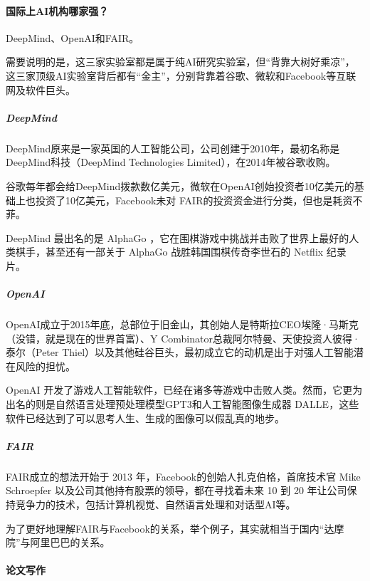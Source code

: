 \documentclass[letterpaper,10pt,english]{sphinxmanual}
\begin{document}
\paragraph{国际上AI机构哪家强？}
\label{\detokenize{chapter_AI_dive/AI_Research:id1}}
DeepMind、OpenAI和FAIR。

需要说明的是，这三家实验室都是属于纯AI研究实验室，但“背靠大树好乘凉”，这三家顶级AI实验室背后都有“金主”，分别背靠着谷歌、微软和Facebook等互联网及软件巨头。


\subparagraph{DeepMind}
\label{\detokenize{chapter_AI_dive/AI_Research:deepmind}}
DeepMind原来是一家英国的人工智能公司，公司创建于2010年，最初名称是DeepMind科技（DeepMind
Technologies Limited），在2014年被谷歌收购。

谷歌每年都会给DeepMind拨款数亿美元，微软在OpenAI创始投资者10亿美元的基础上也投资了10亿美元，Facebook未对
FAIR的投资资金进行分类，但也是耗资不菲。

DeepMind 最出名的是 AlphaGo
，它在围棋游戏中挑战并击败了世界上最好的人类棋手，甚至还有一部关于
AlphaGo 战胜韩国围棋传奇李世石的 Netflix 纪录片。


\subparagraph{OpenAI}
\label{\detokenize{chapter_AI_dive/AI_Research:openai}}
OpenAI成立于2015年底，总部位于旧金山，其创始人是特斯拉CEO埃隆·马斯克（没错，就是现在的世界首富）、Y
Combinator总裁阿尔特曼、天使投资人彼得·泰尔（Peter
Thiel）以及其他硅谷巨头，最初成立它的动机是出于对强人工智能潜在风险的担忧。

OpenAI
开发了游戏人工智能软件，已经在诸多等游戏中击败人类。然而，它更为出名的则是自然语言处理预处理模型GPT\sphinxhyphen{}3和人工智能图像生成器
DALL\sphinxhyphen{}E，这些软件已经达到了可以思考人生、生成的图像可以假乱真的地步。


\subparagraph{FAIR}
\label{\detokenize{chapter_AI_dive/AI_Research:fair}}
FAIR成立的想法开始于 2013 年，Facebook的创始人扎克伯格，首席技术官 Mike
Schroepfer 以及公司其他持有股票的领导，都在寻找着未来 10 到 20
年让公司保持竞争力的技术，包括计算机视觉、自然语言处理和对话型AI等。

为了更好地理解FAIR与Facebook的关系，举个例子，其实就相当于国内“达摩院”与阿里巴巴的关系。%
\begin{footnote}[917]\sphinxAtStartFootnote
{}
%
\end{footnote}


\paragraph{论文写作}
\label{\detokenize{chapter_AI_dive/AI_Research:id2}}
\end{document}
